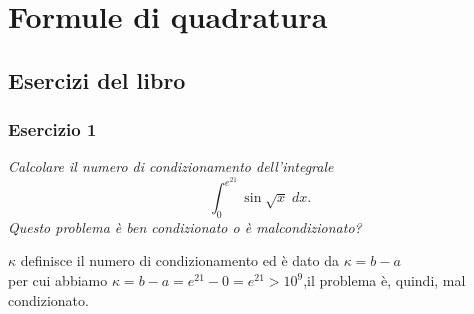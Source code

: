 \chapter{Formule di quadratura}
\label{chap:Cap5}
\section{Esercizi del libro}
\label{sec:Esercizi del libro}

\subsection{Esercizio 1}
\label{sub:es1}
\emph{Calcolare il numero di condizionamento dell'integrale
$$\int_0^{e^{21}}\sin\sqrt{x}\;dx.$$
Questo problema è ben condizionato o è malcondizionato?}
\begin{sol}
	$\kappa$ definisce il numero di condizionamento ed è dato da $\kappa=b-a$\\
	per cui abbiamo $\kappa=b-a=e^{21}-0=e^{21}>10^{9}$,il	problema è, quindi, mal condizionato.
\end{sol}


